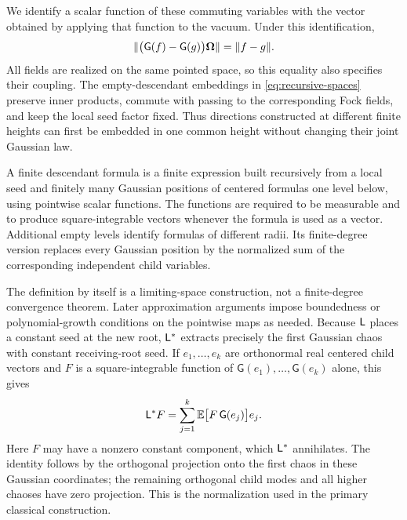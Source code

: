 We identify a scalar function of these commuting variables with the
vector obtained by applying that function to the vacuum.  Under this
identification,
\begin{equation}
 \lVert \bigl(\mathsf G(f)-\mathsf G(g)\bigr)\boldsymbol\Omega\rVert
      =\lVert f-g\rVert.
 \label{eq:classical-gaussian-isometry}
\end{equation}
All fields are realized on the same pointed space, so this equality
also specifies their coupling.  The empty-descendant embeddings in
\eqref{eq:recursive-spaces} preserve inner products, commute with
passing to the corresponding Fock fields, and keep the local seed
factor fixed.  Thus directions constructed at different finite
heights can first be embedded in one common height without changing
their joint Gaussian law.

\begin{definition}
\label{def:finite-descendant-formula}
A finite descendant formula is a finite expression built recursively
from a local seed and finitely many Gaussian positions of centered
formulas one level below, using pointwise scalar functions.  The
functions are required to be measurable and to produce square-integrable
vectors whenever the formula is used as a vector.  Additional empty
levels identify formulas of different radii.  Its finite-degree version
replaces every Gaussian position by the normalized sum of the
corresponding independent child variables.
\end{definition}

The definition by itself is a limiting-space construction, not a
finite-degree convergence theorem.  Later approximation arguments
impose boundedness or polynomial-growth conditions on the pointwise
maps as needed.  Because $\mathsf L$ places a constant seed at the new root,
$\mathsf L^*$ extracts precisely the first Gaussian chaos with constant
receiving-root seed.  If $e_1,\ldots,e_k$ are orthonormal real centered
child vectors and $F$ is a square-integrable function of
$\mathsf G(e_1),\ldots,\mathsf G(e_k)$ alone, this gives
\begin{equation}\label{eq:classical-first-chaos}
 \mathsf L^*F
   =\sum_{j=1}^k
       \mathbb E\bigl[F\,\mathsf G(e_j)\bigr]e_j.
\end{equation}
Here $F$ may have a nonzero constant component, which $\mathsf L^*$
annihilates.  The identity follows by the orthogonal projection onto
the first chaos in these Gaussian coordinates; the remaining
orthogonal child modes and all higher chaoses have zero projection.
This is the normalization used in the primary classical construction.

